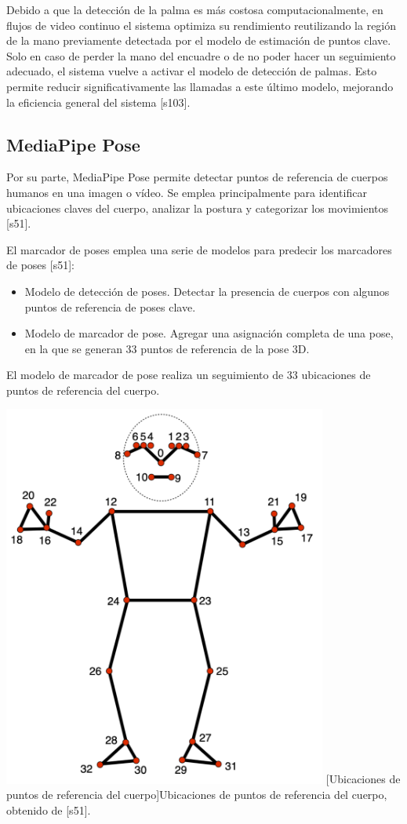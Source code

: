 Debido a que la detección de la palma es más costosa computacionalmente, en flujos de video continuo el sistema optimiza su rendimiento reutilizando la región de la mano previamente detectada por el modelo de estimación de puntos clave. Solo en caso de perder la mano del encuadre o de no poder hacer un seguimiento adecuado, el sistema vuelve a activar el modelo de detección de palmas. Esto permite reducir significativamente las llamadas a este último modelo, mejorando la eficiencia general del sistema [s103].\\

\subsection{MediaPipe Pose}
Por su parte, MediaPipe Pose permite detectar puntos de referencia de cuerpos humanos en una imagen o vídeo. Se emplea principalmente para identificar ubicaciones claves del cuerpo, analizar la postura y categorizar los movimientos [s51].

El marcador de poses emplea una serie de modelos para predecir los marcadores de poses [s51]:
\begin{itemize}

    \item Modelo de detección de poses. Detectar la presencia de cuerpos con algunos puntos de referencia de poses clave.
    \item Modelo de marcador de pose. Agregar una asignación completa de una pose, en la que se generan 33 puntos de referencia de la pose 3D.

\end{itemize}
El modelo de marcador de pose realiza un seguimiento de 33 ubicaciones de puntos de referencia del cuerpo.
\begin{center}
    \includegraphics[width=0.8\textwidth]{Images/Cap 2/MediaPipe_Pose.png}
    [Ubicaciones de puntos de referencia del cuerpo]{Ubicaciones de puntos de referencia del cuerpo, obtenido de [s51].}  %
\end{center}

